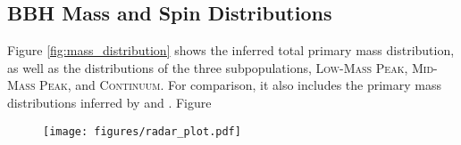 \subsection{BBH Mass and Spin Distributions}

Figure \ref{fig:mass_distribution} shows the inferred total primary mass distribution, as well as the distributions of the three subpopulations, \textsc{Low-Mass Peak}, \textsc{Mid-Mass Peak}, and \textsc{Continuum}. For comparison, it also includes the primary mass distributions inferred by  and . Figure 

\begin{figure}[ht!]
    \begin{centering}
        \texttt{[image: figures/radar\_plot.pdf]}
        \caption{}
        \label{fig:radar_plot}
    \end{centering}
\end{figure}
